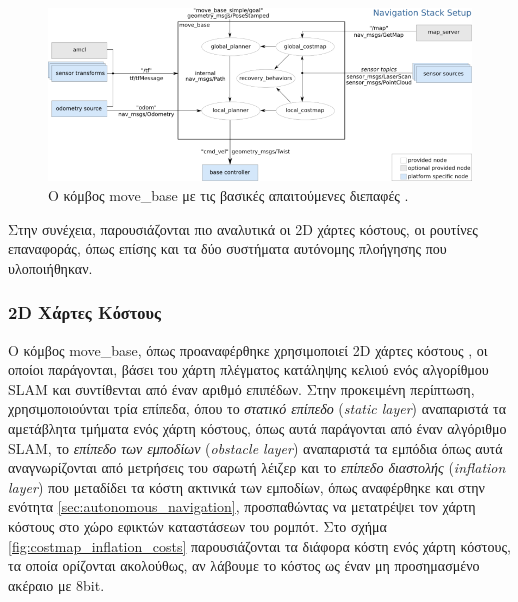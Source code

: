 \begin{figure}[!ht]
	\centering
	\includegraphics[width=\linewidth]{Chapters/Chapter4/Figures/move_base.png}
	\caption{Ο κόμβος move{\_}base με τις βασικές απαιτούμενες διεπαφές \cite{move_base}.}
	\label{fig:move_base}
\end{figure}

Στην συνέχεια, παρουσιάζονται πιο αναλυτικά οι 2D χάρτες κόστους, οι ρουτίνες επαναφοράς, όπως επίσης και τα δύο συστήματα αυτόνομης πλοήγησης που υλοποιήθηκαν.

\subsubsection{2D Χάρτες Κόστους}
\bigskip
Ο κόμβος move{\_}base, όπως προαναφέρθηκε χρησιμοποιεί 2D χάρτες κόστους \cite{costmap_2d}, οι οποίοι παράγονται, βάσει του χάρτη πλέγματος κατάληψης κελιού ενός αλγορίθμου SLAM και συντίθενται από έναν αριθμό επιπέδων. Στην προκειμένη περίπτωση, χρησιμοποιούνται τρία επίπεδα, όπου το \textit{στατικό επίπεδο} (\textit{static layer}) αναπαριστά τα αμετάβλητα τμήματα ενός χάρτη κόστους, όπως αυτά παράγονται από έναν αλγόριθμο SLAM, το \textit{επίπεδο των εμποδίων} (\textit{obstacle layer}) αναπαριστά τα εμπόδια όπως αυτά αναγνωρίζονται από μετρήσεις του σαρωτή λέιζερ και το \textit{επίπεδο διαστολής} (\textit{inflation layer}) που μεταδίδει τα κόστη ακτινικά των εμποδίων, όπως αναφέρθηκε και στην ενότητα \ref{sec:autonomous_navigation}, προσπαθώντας να μετατρέψει τον χάρτη κόστους στο χώρο εφικτών καταστάσεων του ρομπότ. Στο σχήμα \ref{fig:costmap_inflation_costs} παρουσιάζονται τα διάφορα κόστη ενός χάρτη κόστους, τα οποία ορίζονται ακολούθως, αν λάβουμε το κόστος ως έναν μη προσημασμένο ακέραιο με 8bit.

